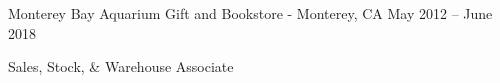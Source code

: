 \documentclass[letterpaper, 10 pt]{article}
\begin{document}
\noindent
\centerline{Monterey Bay Aquarium Gift and Bookstore - Monterey, CA \hfill May 2012 – June 2018}

Sales, Stock, \& Warehouse Associate



\end{document}
